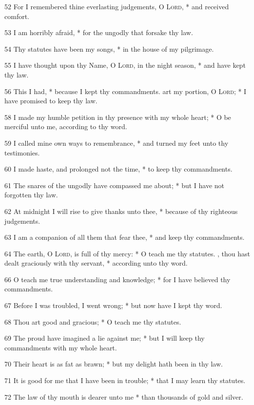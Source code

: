 52 For I remembered thine everlasting judgements, O {\textsc{Lord}}, * and received comfort.\par
53 I am horribly afraid, * for the ungodly that forsake thy law.\par
54 Thy statutes have been my songs, * in the house of my pilgrimage.\par
55 I have thought upon thy Name, O {\textsc{Lord}}, in the night season, * and have kept thy law.\par
56 This I had, * because I kept thy commandments.
 art my portion, O {\textsc{Lord}}; * I have promised to keep thy law.\par
58 I made my humble petition in thy presence with my whole heart; * O be merciful unto me, according to thy word.\par
59 I called mine own ways to remembrance, * and turned my feet unto thy testimonies.\par
60 I made haste, and prolonged not the time, * to keep thy commandments.\par
61 The snares of the ungodly have compassed me about; * but I have not forgotten thy law.\par
62 At midnight I will rise to give thanks unto thee, * because of thy righteous judgements.\par
63 I am a companion of all them that fear thee, * and keep thy commandments.\par
64 The earth, O {\textsc{Lord}}, is full of thy mercy: * O teach me thy statutes.
, thou hast dealt graciously with thy servant, * according unto thy word.\par
66 O teach me true understanding and knowledge; * for I have believed thy commandments.\par
67 Before I was troubled, I went wrong; * but now have I kept thy word.\par
68 Thou art good and gracious; * O teach me thy statutes.\par
69 The proud have imagined a lie against me; * but I will keep thy commandments with my whole heart.\par
70 Their heart is as fat as brawn; * but my delight hath been in thy law.\par
71 It is good for me that I have been in trouble; * that I may learn thy statutes.\par
72 The law of thy mouth is dearer unto me * than thousands of gold and silver.
